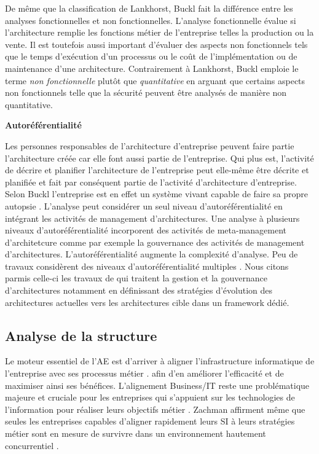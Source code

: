 \begin{description}
De même que la classification de Lankhorst, Buckl fait la différence entre les analyses fonctionnelles et non fonctionnelles. L'analyse fonctionnelle évalue si l'architecture remplie les fonctions métier de l'entreprise telles la production ou la vente. Il est toutefois aussi important d'évaluer des aspects non fonctionnels tels que le temps d'exécution d'un processus ou le coût de l'implémentation ou de maintenance d'une architecture. Contrairement à Lankhorst, Buckl emploie le terme \textit{non fonctionnelle} plutôt que \textit{quantitative} en arguant que certains aspects non fonctionnels telle que la sécurité peuvent être analysés de manière non quantitative.  

	\item \textbf{Autoréférentialité}
	
Les personnes responsables de l'architecture d'entreprise peuvent faire partie l'architecture créée car elle font aussi partie de l'entreprise. Qui plus est, l'activité de décrire et planifier l'architecture de l'entreprise peut elle-même être décrite et planifiée et fait par conséquent partie de l'activité d'architecture d'entreprise. Selon Buckl \cite{varela1974autopoiesis} l'entreprise est en effet un système vivant capable de faire sa propre autopsie \cite{varela1974autopoiesis}.
L'analyse peut considérer un seul niveau d'autoréférentialité en intégrant les activités de management d'architectures. Une analyse à plusieurs niveaux d'autoréférentialité incorporent des activités de meta-management d'architetcure comme par exemple la gouvernance des activités de management d'architectures.
L'autoréférentialité augmente la complexité d'analyse. Peu de travaux considèrent des niveaux d'autoréférentialité  multiples \cite{smook2014executable}. Nous citons parmis celle-ci les travaux de \cite{metrailler_evolis_2014} qui traitent la gestion et la gouvernance d'architectures notamment en définissant des stratégies d'évolution des architectures actuelles vers les architectures cible dans un framework dédié. 

\end{description}

	\subsection{Analyse de la structure}
	Le moteur essentiel de l'AE est d'arriver à aligner l'infrastructure informatique de l'entreprise avec ses processus métier \cite{lankhorst2013enterprise}. afin d'en améliorer l'efficacité et de maximiser ainsi ses bénéfices. L'alignement Business/IT reste une problématique majeure et cruciale pour les entreprises qui s'appuient sur les technologies de l'information pour réaliser leurs objectifs métier \cite{kaisler_enterprise_2005}. Zachman affirment même que seules les entreprises capables d'aligner rapidement leurs SI à leurs stratégies métier sont en mesure de survivre dans un environnement hautement concurrentiel \cite{zachman1997enterprise}.
	
